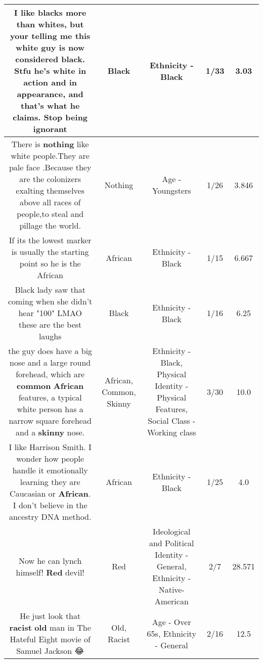\documentclass[11pt]{article}
\newlength\mylength
\begin{document}
\begin{center}
\begin{longtable}{|C{.65\mylength}|C{.30\mylength}|C{.12\mylength}|C{.12\mylength}|C{.12\mylength}|}
  \small I like blacks more than whites, but your telling me this white guy is now considered \textbf{black}. Stfu he's white in action and in appearance, and that's what he claims. Stop being ignorant\normalsize   & Black & Ethnicity - Black & 1/33 & 3.03 \\  \hline
  \small There is \textbf{nothing} like white people.They are pale face .Because they are the colonizers exalting themselves above all races of people,to  steal and pillage the world.\normalsize   & Nothing & Age - Youngsters & 1/26 & 3.846 \\  \hline
  \small If its the lowest marker is usually the starting point so he is the African\normalsize   & African & Ethnicity - Black & 1/15 & 6.667 \\  \hline
  \small Black lady saw that coming when she didn't hear "100" LMAO these are the best laughs\normalsize   & Black & Ethnicity - Black & 1/16 & 6.25 \\  \hline
  \small the guy does have a big nose and a large round forehead, which are \textbf{common} \textbf{African} features, a typical white person has a narrow square forehead and a \textbf{skinny} nose.\normalsize   & African, Common, Skinny & Ethnicity - Black, Physical Identity - Physical Features, Social Class - Working class & 3/30 & 10.0 \\  \hline
  \small I like Harrison Smith. I wonder how people handle it emotionally learning they are Caucasian or \textbf{African}. I don't believe in the ancestry DNA method.\normalsize   & African & Ethnicity - Black & 1/25 & 4.0 \\  \hline
  \small Now he can lynch himself! \textbf{R\textbf{ed}} devil!\normalsize   & Red &  Ideological and Political Identity - General, Ethnicity - Native-American & 2/7 & 28.571 \\  \hline
  \small He just look that \textbf{racist} \textbf{old} man in The Hateful Eight movie of Samuel Jackson 😂\normalsize   & Old, Racist & Age - Over 65s, Ethnicity - General & 2/16 & 12.5 \\  \hline

\end{longtable}
\end{center}
\end{document}
